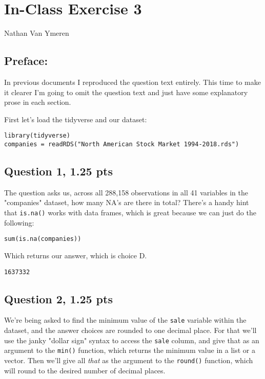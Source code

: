 \documentclass[11pt]{article}
\author{Nathan Van Ymeren}
\date{\today}
\title{}
\begin{document}
\section*{In-Class Exercise 3}
\label{sec:org73d284c}
Nathan Van Ymeren
\subsection*{Preface:}
\label{sec:org2bfdc8b}
In previous documents I reproduced the question text entirely.  This time to make it clearer I'm going to omit the question text and just have some explanatory prose in each section.

First let's load the tidyverse and our dataset:

\begin{verbatim}
library(tidyverse)
companies = readRDS("North American Stock Market 1994-2018.rds")

\end{verbatim}

\subsection*{Question 1, 1.25 pts}
\label{sec:org6098419}
The question asks us, across all 288,158 observations in all 41 variables in the "companies" dataset, how many NA's are there in total?  There's a handy hint that \texttt{is.na()} works with data frames, which is great because we can just do the following:

\begin{verbatim}
sum(is.na(companies))
\end{verbatim}

Which returns our answer, which is choice D.
\begin{verbatim}
1637332
\end{verbatim}

\subsection*{Question 2, 1.25 pts}
\label{sec:org89d98aa}
We're being asked to find the minimum value of the \texttt{sale} variable within the dataset, and the answer choices are rounded to one decimal place.  For that we'll use the janky "dollar sign" syntax to access the \texttt{sale} column, and give that as an argument to the \texttt{min()}  function, which returns the minimum value in a list or a vector.  Then we'll give all \emph{that} as the argument to the \texttt{round()} function, which will round to the desired number of decimal places.
\end{document}
